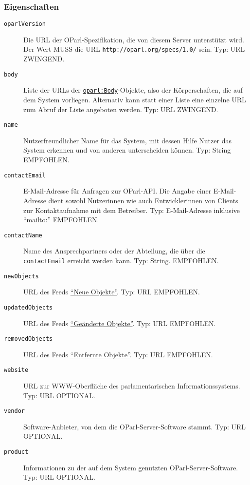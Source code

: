 \documentclass[,a4paper]{article}
\begin{document}
\subsubsection{Eigenschaften}\label{eigenschaften}

\begin{description}
\item[\texttt{oparlVersion}]
Die URL der OParl-Spezifikation, die von diesem Server unterstützt wird.
Der Wert MUSS die URL \texttt{http://oparl.org/specs/1.0/} sein. Typ:
URL ZWINGEND.
\item[\texttt{body}]
Liste der URLs der
\hyperref[oparlux5fbody]{\texttt{oparl:Body}}-Objekte, also der
Körperschaften, die auf dem System vorliegen. Alternativ kann statt
einer Liste eine einzelne URL zum Abruf der Liste angeboten werden. Typ:
URL ZWINGEND.
\item[\texttt{name}]
Nutzerfreundlicher Name für das System, mit dessen Hilfe Nutzer das
System erkennen und von anderen unterscheiden können. Typ: String
EMPFOHLEN.
\item[\texttt{contactEmail}]
E-Mail-Adresse für Anfragen zur OParl-API. Die Angabe einer
E-Mail-Adresse dient sowohl Nutzerinnen wie auch Entwicklerinnen von
Clients zur Kontaktaufnahme mit dem Betreiber. Typ: E-Mail-Adresse
inklusive ``mailto:'' EMPFOHLEN.
\item[\texttt{contactName}]
Name des Ansprechpartners oder der Abteilung, die über die
\texttt{contactEmail} erreicht werden kann. Typ: String. EMPFOHLEN.
\item[\texttt{newObjects}]
URL des Feeds \hyperref[feedux5fneueux5fobjekte]{``Neue Objekte''}. Typ:
URL EMPFOHLEN.
\item[\texttt{updatedObjects}]
URL des Feeds \hyperref[feedux5fgeaenderteux5fobjekte]{``Geänderte
Objekte''}. Typ: URL EMPFOHLEN.
\item[\texttt{removedObjects}]
URL des Feeds \hyperref[feedux5fentfernteux5fobjekte]{``Entfernte
Objekte''}. Typ: URL EMPFOHLEN.
\item[\texttt{website}]
URL zur WWW-Oberfläche des parlamentarischen Informationssystems. Typ:
URL OPTIONAL.
\item[\texttt{vendor}]
Software-Anbieter, von dem die OParl-Server-Software stammt. Typ: URL
OPTIONAL.
\item[\texttt{product}]
Informationen zu der auf dem System genutzten OParl-Server-Software.
Typ: URL OPTIONAL.
\end{description}

\end{document}
